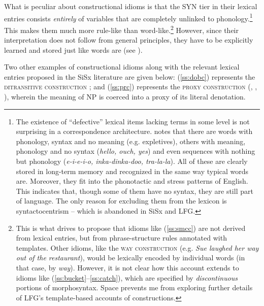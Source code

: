 \documentclass[output=paper,hidelinks]{langscibook}
\begin{document}
What is peculiar about constructional idioms is that the SYN tier in their lexical entries consists \textit{entirely} of variables that are completely unlinked to phonology.\footnote{The existence of ``defective'' lexical items lacking terms in some level is not surprising in a correspondence architecture. \citet[94]{jackendoff1997the-architecture} notes that there are words with phonology, syntax and no meaning (e.g. expletives), others with meaning, phonology and no syntax (\textit{hello, ouch, yes}) and even sequences with nothing but phonology (\textit{e-i-e-i-o, inka-dinka-doo, tra-la-la}). All of these are clearly stored in long-term memory and recognized in the same way typical words are. Moreover, they fit into the phonotactic and stress patterns of English. This indicates that, though some of them have no syntax, they are still part of language. The only reason for excluding them from the lexicon is syntactocentrism -- which is abandoned in SiSx and LFG.} This makes them much more rule-like than word-like.\footnote{This is what drives \citet{asudeh2013constructions} to propose that idioms  like (\ref{ss:smcc}) are not derived from lexical entries, but from phrase-structure rules annotated with templates. Other idioms, like the \textsc{way construction} (e.g. \textit{Sue laughed her way out of the restaurant}), would be lexically encoded by individual words (in that case, by \textit{way}). However, it is not clear how this account extends to idioms like (\ref{ss:bucket}--\ref{ss:catch}), which are specified by \textit{discontinuous} portions of morphosyntax. Space prevents me from exploring further details of LFG's template-based accounts of constructions.} However, since their interpretation does not follow from general principles, they have to be explicitly learned and stored just like words are (see \citealt{culicover1999syntactic}).

Two other examples of constructional idioms along with the relevant lexical entries proposed in the SiSx literature are given below: (\ref{ss:dobc}) represents the \textsc{ditransitive construction} \citep{jackendoff1990semantic, goldberg1995constructions, asudeh2014meaning}; and (\ref{ss:prc}) represents the \textsc{proxy construction} (\citealt{nunberg1979non}, \citealt{jackendoff1997the-architecture}, \citealt{varaschin2020anti}), wherein the meaning of NP is coerced into a proxy of its literal denotation.
\end{document}
